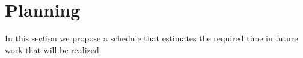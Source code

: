 \section{Planning}
\label{sec:Planning}
In this section we propose a schedule that estimates the required time in future work that will be realized.\\

\begin{tabular}

\end{tabular}
